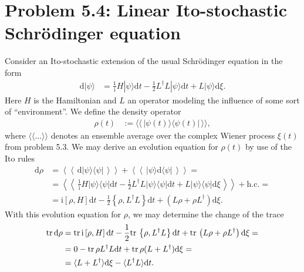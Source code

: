\documentclass[english, parskip=full]{scrartcl}
\newcommand{\bra}{}
\newcommand{\kla}{}
\newcommand{\klam}{}
\newcommand{\klammer}{}
\newcommand{\oper}{}
\newcommand{\tecxt}{}
\newcommand{\Ket}{}
\renewcommand{\i}{\text{i}}
\begin{document}
\newpage
\section*{Problem 5.4: Linear Ito-stochastic Schrödinger equation}
Consider an Ito-stochastic extension of the usual Schrödinger equation in the form
\begin{align}
\tecxt\text{d}\Ket | {\psi} \rangle &= \frac{1}{\i} H\Ket | {\psi} \rangle \tecxt\text{d}t - \frac{1}{2} L^\dagger L\Ket | {\psi} \rangle \tecxt\text{d}t + L\Ket | {\psi} \rangle \tecxt\text{d}\xi.
\end{align}
Here $H$ is the Hamiltonian and $L$ an operator modeling the influence of some sort of ``environment''.
We define the density operator 
\begin{align}
\rho (t) &:= \bra\langle {\bra\langle {\, \oper | {\psi(t) } \rangle\langle {\psi(t)} | \,}\rangle }\rangle,
\end{align}
where $\langle\langle ... \rangle\rangle $ denotes an ensemble average over the complex Wiener process $\xi(t)$ from problem 5.3.
We may derive an evolution equation for $\rho(t)$ by use of the Ito rules
\begin{align}
\tecxt\text{d}\rho &=  \left\langle\left\langle\,  \tecxt\text{d}\oper | {\psi} \rangle  \langle {\psi} | \,\right\rangle\right\rangle + \left\langle\left\langle\, \oper | {\psi} \rangle \tecxt\text{d} \langle {\psi} | \,\right\rangle\right\rangle = \\
&= \left\langle\left\langle\, \frac{1}{\i} H | {\psi} \rangle  \langle {\psi} | \tecxt\text{d}t - \frac{1}{2} L^\dagger L | {\psi} \rangle  \langle {\psi} | \tecxt\text{d}t + L | {\psi} \rangle  \langle {\psi} | \tecxt\text{d}\xi  \,\right\rangle\right\rangle + \tecxt\text{h.c.} = \\
&= \i \klam\left[ {\rho, H} \right] \tecxt\text{d}t - \frac{1}{2} \klammer\left\{{\rho, L^\dagger L} \right\} \tecxt\text{d}t + \kla\left( {L\rho + \rho L^\dagger} \right) \tecxt\text{d}\xi.
\end{align}
With this evolution equation for $\rho$, we may determine the change of the trace
\begin{align}
\tecxt\text{tr\,} \tecxt\text{d}\rho &= \tecxt\text{tr\,} \i \klam\left[  \rho, H  \right] \tecxt\text{d}t - \frac{1}{2} \tecxt\text{tr\,} \klammer\left\{ \rho, L^\dagger L  \right\} \tecxt\text{d}t + \tecxt\text{tr\,} \kla\left( { L\rho + \rho L^\dagger} \right) \tecxt\text{d}\xi = \\
&= 0 - \tecxt\text{tr\,} \rho L^\dagger L \tecxt\text{d}t + \tecxt\text{tr\,} \rho (L + L^\dagger) \tecxt\text{d}\xi = \\
&= \bra\langle  L + L^\dagger \rangle \tecxt\text{d}\xi - \bra\langle  L^\dagger L \rangle \tecxt\text{d}t.
\end{align}
\end{document}
